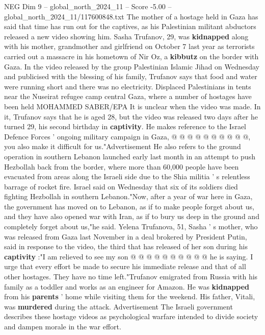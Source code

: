 \begin{textsample}{NEG Dim 9 – global\_north\_2024\_11 – Score -5.00 – global\_north\_2024\_11/117600848.txt}  \label{ex:f9_neg_205}
The mother of a hostage held in Gaza has said that time has run out for the captives, as his Palestinian militant abductors released a new video showing him.
Sasha Trufanov, 29, was \textbf{kidnapped} along with his mother, grandmother and girlfriend on October 7 last year as terrorists carried out a massacre in his hometown of Nir Oz, a \textbf{kibbutz} on the border with Gaza.
In the video released by the group Palestinian Islamic Jihad on Wednesday and publicised with the blessing of his family, Trufanov says that food and water were running short and there was no electricity.
Displaced Palestinians in tents near the Nuseirat refugee camp central Gaza, where a number of hostages have been held MOHAMMED SABER/EPA It is unclear when the video was made.
In it, Trufanov says that he is aged 28, but the video was released two days after he turned 29, his second birthday in \textbf{captivity}.
He makes reference to the Israel Defence Forces ' ongoing military campaign in Gaza, @ @ @ @ @ @ @ @ @ @, you also make it difficult for us."Advertisement He also refers to the ground operation in southern Lebanon launched early last month in an attempt to push Hezbollah back from the border, where more than 60,000 people have been evacuated from areas along the Israeli side due to the Shia militia ' s relentless barrage of rocket fire.
Israel said on Wednesday that six of its soldiers died fighting Hezbollah in southern Lebanon."Now, after a year of war here in Gaza, the government has moved on to Lebanon, as if to make people forget about us, and they have also opened war with Iran, as if to bury us deep in the ground and completely forget about us,"he said.
Yelena Trufanova, 51, Sasha ' s mother, who was released from Gaza last November in a deal brokered by President Putin, said in response to the video, the third that has released of her son during his \textbf{captivity} :"I am relieved to see my son @ @ @ @ @ @ @ @ @ @ he is saying.
I urge that every effort be made to secure his immediate release and that of all other hostages.
They have no time left."Trufanov emigrated from Russia with his family as a toddler and works as an engineer for Amazon.
He was \textbf{kidnapped} from his \textbf{parents} ' home while visiting them for the weekend.
His father, Vitali, was \textbf{murdered} during the attack.
Advertisement The Israeli government describes these hostage videos as psychological warfare intended to divide society and dampen morale in the war effort.

\end{textsample}
